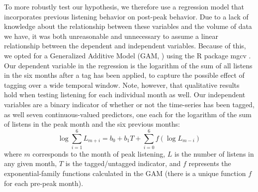  To more robustly test our hypothesis, we therefore use a regression model that incorporates previous listening behavior on post-peak behavior. Due to a lack of knowledge about the relationship between these variables and the volume of data we have, it was both unreasonable and unnecessary to assume a linear relationship between the dependent and independent variables. Because of this, we opted for a Generalized Additive Model (GAM, \cite{hastie1990generalized}) using the R package mgcv \cite{wood2001mgcv}. Our dependent variable in the regression is the logarithm of the sum of all listens in the six months after a tag has been applied, to capture the possible effect of tagging over a wide temporal window. Note, however, that qualitative results hold when testing listening for each individual month as well.
Our independent variables are a binary indicator of whether or not the time-series has been tagged, as well seven continuous-valued predictors, one each for the logarithm of the sum of listens in the peak month and the six previous months:   
\begin{equation}
\log \sum_{i=1}^{6}L_{m+i} = b_{0} + b_{1}T + \sum_{i=0}^{6}f(\log L_{m-i}) 
\end{equation}
\noindent where $m$ corresponds to the month of peak listening, $L$ is the number of listens in any given month, $T$ is the tagged/untagged indicator, and $f$ represents the exponential-family functions calculated in the GAM (there is a unique function $f$ for each pre-peak month).

